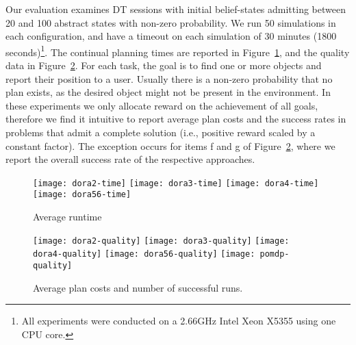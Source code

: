 
Our evaluation examines DT sessions with initial belief-states
admitting between 20 and 100 abstract states with non-zero
probability. We run 50 simulations in each configuration, and have a
timeout on each simulation of 30 minutes (1800 seconds)\footnote{All
experiments were conducted on a 2.66GHz Intel Xeon X5355 using one CPU
core.}. The continual planning times are reported in
Figure~\ref{fig:results-time}, and the quality data in
Figure~\ref{fig:results-quality}.
For each task, the goal is to find one or more objects and report
their position to a user. Usually there is a non-zero probability that
no plan exists, as the desired object might not be present in the
environment.
In these experiments we only allocate reward on the achievement of all
goals, therefore we find it intuitive to report average plan costs and
the success rates in problems that admit a complete solution (i.e.,
positive reward scaled by a constant factor). The exception occurs for
items f and g of Figure~\ref{fig:results-quality}, where we report the
overall success rate of the respective approaches.

\begin{figure}[h!]
  \texttt{[image: dora2-time]}\hfill
  \texttt{[image: dora3-time]}\hfill
  \texttt{[image: dora4-time]}\hfill
  \vspace{2mm}
  \texttt{[image: dora56-time]}\hfill
  \caption{Average runtime}
  \label{fig:results-time}
\end{figure}

\begin{figure}[h!]
  \texttt{[image: dora2-quality]}\hfill
  \texttt{[image: dora3-quality]}\hfill
  \texttt{[image: dora4-quality]}\hfill
  \vspace{2mm}
  \texttt{[image: dora56-quality]}\hfill
  \vspace{2mm}
  \texttt{[image: pomdp-quality]}\hfill
  \caption{Average plan costs and number of successful runs.}
  \label{fig:results-quality}
\end{figure}

